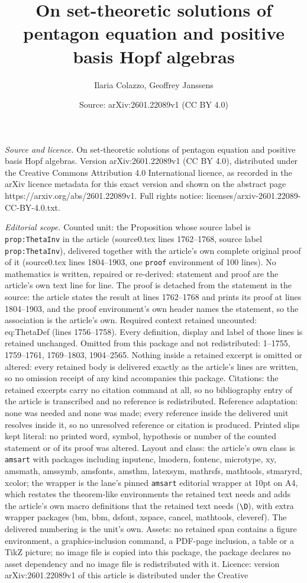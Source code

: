 \documentclass[10pt,a4paper]{amsart}
\title[On set-theoretic solutions of pentagon equation and positive]{On set-theoretic solutions of pentagon equation and positive basis Hopf algebras}
\author{Ilaria Colazzo, Geoffrey Janssens}
\date{Source: arXiv:2601.22089v1 (CC BY 4.0)}
\begin{document}
\maketitle

\noindent\emph{Source and licence.} On set-theoretic solutions of pentagon equation and positive basis Hopf algebras. Version arXiv:2601.22089v1 (CC BY 4.0), distributed under the Creative Commons Attribution 4.0 International licence, as recorded in the arXiv licence metadata for this exact version and shown on the abstract page https://arxiv.org/abs/2601.22089v1. Full rights notice: licenses/arxiv-2601.22089-CC-BY-4.0.txt.\par\smallskip

\noindent\textit{Editorial scope.} Counted unit: the Proposition whose source label is \texttt{prop:ThetaInv} in the article (source0.tex lines 1762--1768, source label \texttt{prop:ThetaInv}), delivered together with the article's own complete original proof of it (source0.tex lines 1804--1903, one \texttt{proof} environment of 100 lines). No mathematics is written, repaired or re-derived: statement and proof are the article's own text line for line. The proof is detached from the statement in the source: the article states the result at lines 1762--1768 and prints its proof at lines 1804--1903, and the proof environment's own header names the statement, so the association is the article's own. Required context retained uncounted: eq:ThetaDef (lines 1756--1758). Every definition, display and label of those lines is retained unchanged. Omitted from this package and not redistributed: 1--1755, 1759--1761, 1769--1803, 1904--2565. Nothing inside a retained excerpt is omitted or altered: every retained body is delivered exactly as the article's lines are written, so no omission receipt of any kind accompanies this package. Citations: the retained excerpts carry no citation command at all, so no bibliography entry of the article is transcribed and no reference is redistributed. Reference adaptation: none was needed and none was made; every reference inside the delivered unit resolves inside it, so no unresolved reference or citation is produced. Printed slips kept literal: no printed word, symbol, hypothesis or number of the counted statement or of its proof was altered. Layout and class: the article's own class is \texttt{amsart} with packages including inputenc, lmodern, fontenc, microtype, xy, amsmath, amssymb, amsfonts, amsthm, latexsym, mathrsfs, mathtools, stmaryrd, xcolor; the wrapper is the lane's pinned \texttt{amsart} editorial wrapper at 10pt on A4, which restates the theorem-like environments the retained text needs and adds the article's own macro definitions that the retained text needs (\texttt{\textbackslash D}), with extra wrapper packages (bm, bbm, dsfont, xspace, cancel, mathtools, cleveref). The delivered numbering is the unit's own. Assets: no retained span contains a figure environment, a graphics-inclusion command, a PDF-page inclusion, a table or a TikZ picture; no image file is copied into this package, the package declares no asset dependency and no image file is redistributed with it. Licence: version arXiv:2601.22089v1 of this article is distributed under the Creative 
\end{document}
